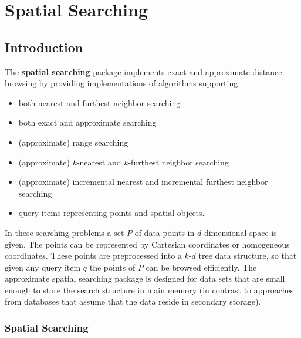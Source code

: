 \chapter{Spatial Searching}

\section{Introduction}

The {\bf spatial searching} package implements
exact and approximate distance browsing
by providing implementations of algorithms supporting

\begin{itemize} 

\item
both nearest and furthest neighbor searching

\item
both exact and approximate searching

\item
(approximate) range searching

\item 
(approximate) $k$-nearest and $k$-furthest neighbor searching

\item 
(approximate) incremental nearest and incremental furthest neighbor searching

\item
query items representing points and spatial objects.

\end{itemize}

In these searching problems a set $P$ of data points in $d$-dimensional
space is given.
The points can be represented by Cartesian coordinates or homogeneous coordinates.
These points are preprocessed into a $k$-$d$ tree data structure, so that given
any query item $q$ the points of $P$ can be browsed efficiently.
The approximate spatial searching package is designed for data sets that are small enough to store
the search structure in main memory (in contrast to approaches
from databases that assume that the data reside in secondary storage).

\subsection{Spatial Searching}

